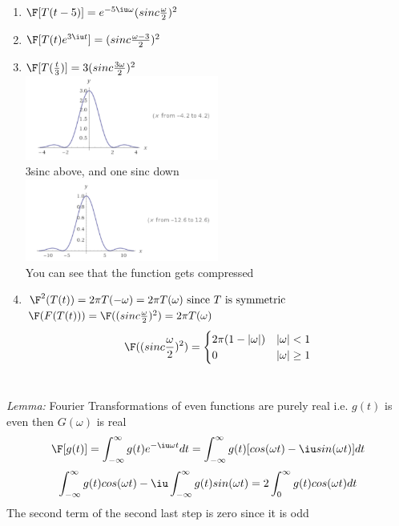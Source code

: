 \documentclass[11pt]{article}
\theoremstyle{definition}
\begin{document}
\begin{enumerate}
    \item $\F[T(t-5)] = e^{-5\iu\omega}(sinc\frac{\omega}{2})^2$
    \item $\F[T(t)e^{3\iu t}] = (sinc\frac{\omega-3}{2})^2$
    \item $\F[T(\frac{t}{3})] = 3(sinc\frac{3\omega}{2})^2$\\
    \includegraphics[width=0.5\textwidth]{3sinc.png}\\
    3sinc above, and one sinc down\\
    \includegraphics[width=0.5\textwidth]{sinc.png}\\
    You can see that the function gets compressed
    \item $\F^2(T(t)) = 2\pi T(-\omega) = 2\pi T(\omega) \text{ since $T$ is symmetric}$\\
    $\F(F(T(t))) = \F((sinc\frac{\omega}{2})^2) = 2\pi T(\omega)$\\
    \[\F((sinc\frac{\omega}{2})^2) =  \begin{cases}
      2\pi(1-|\omega|) & |\omega| < 1 \\
      0 & |\omega| \geq 1
   \end{cases}
\]\\
\end{enumerate}
\textit{Lemma:} Fourier Transformations of even functions are purely real i.e. $g(t)$ is even then $G(\omega)$ is real\\
$$\F[g(t)] = \int^{\infty}_{-\infty} g(t) e^{-\iu \omega t}dt = \int^{\infty}_{-\infty} g(t)[cos(\omega t) - \iu sin(\omega t)]dt$$
$$\int^{\infty}_{-\infty} g(t)cos(\omega t) - \iu \int^{\infty}_{-\infty} g(t) sin(\omega t) = 2\int_0^\infty g(t)cos(\omega t) dt$$
The second term of the second last step is zero since it is odd\\
\end{document}
